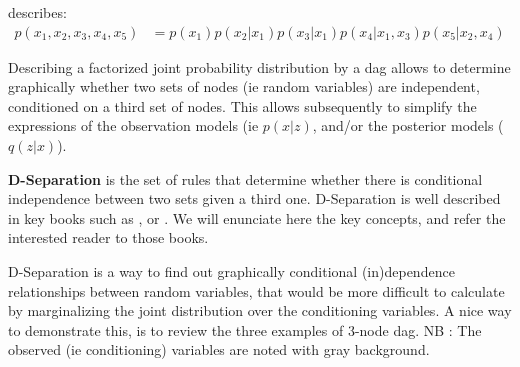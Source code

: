 \begin{center}
\end{center}
describes:
\begin{align}
    p(x_1,x_2,x_3,x_4,x_5) &= p(x_1)p(x_2\vert x_1)p(x_3\vert x_1)p(x_4 \vert x_1, x_3)p(x_5 \vert x_2, x_4)
\end{align}


Describing a factorized joint probability distribution by a \gls{dag} allows to determine graphically whether two sets of nodes (ie random variables) are independent, conditioned on a third set of nodes. This allows subsequently to simplify the expressions of the observation models (ie $p(x \vert z)$, and/or the posterior models ($q(z \vert x)$).

\textbf{D-Separation} is the set of rules that determine whether there is conditional independence between two sets given a third one. D-Separation is well described in key books such as \cite{PRML}, \cite{ProbabilisticGraphicalModels} or \cite{ProbabilisticMachineLearning}. We will enunciate here the key concepts, and refer the interested reader to those books.


D-Separation is a way to find out graphically conditional (in)dependence relationships between random variables, that would be more difficult to calculate by marginalizing the joint distribution over the conditioning variables. A nice way to demonstrate this, is to review the three examples of 3-node \gls{dag}. 
NB : The observed (ie conditioning) variables are noted with gray background.

